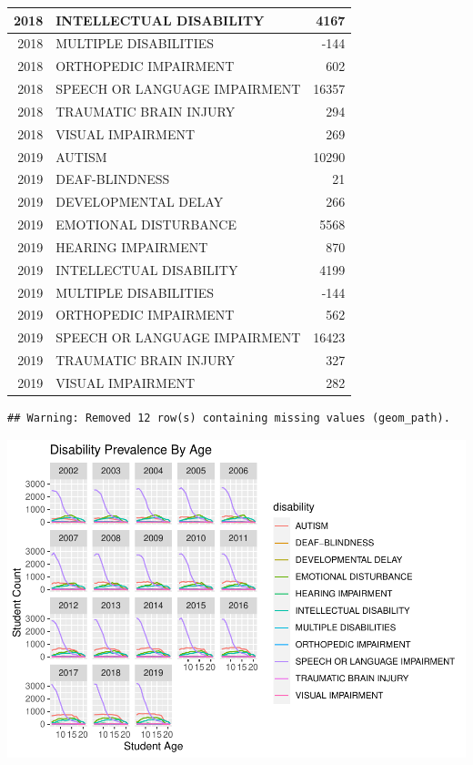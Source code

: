 \documentclass[
  english,
  man]{apa6}
\begin{document}
\begin{tabular}{r|l|r}
\hline
2018 & INTELLECTUAL DISABILITY & 4167\\
\hline
2018 & MULTIPLE DISABILITIES & -144\\
\hline
2018 & ORTHOPEDIC IMPAIRMENT & 602\\
\hline
2018 & SPEECH OR LANGUAGE IMPAIRMENT & 16357\\
\hline
2018 & TRAUMATIC BRAIN INJURY & 294\\
\hline
2018 & VISUAL IMPAIRMENT & 269\\
\hline
2019 & AUTISM & 10290\\
\hline
2019 & DEAF-BLINDNESS & 21\\
\hline
2019 & DEVELOPMENTAL DELAY & 266\\
\hline
2019 & EMOTIONAL DISTURBANCE & 5568\\
\hline
2019 & HEARING IMPAIRMENT & 870\\
\hline
2019 & INTELLECTUAL DISABILITY & 4199\\
\hline
2019 & MULTIPLE DISABILITIES & -144\\
\hline
2019 & ORTHOPEDIC IMPAIRMENT & 562\\
\hline
2019 & SPEECH OR LANGUAGE IMPAIRMENT & 16423\\
\hline
2019 & TRAUMATIC BRAIN INJURY & 327\\
\hline
2019 & VISUAL IMPAIRMENT & 282\\
\hline
\end{tabular}

\begin{verbatim}
## Warning: Removed 12 row(s) containing missing values (geom_path).
\end{verbatim}

\includegraphics{draft_play_files/figure-latex/Oregon plot-1.pdf}
\end{document}
